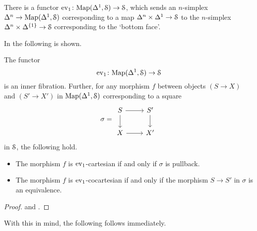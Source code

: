 \documentclass[main.tex]{subfiles}
\begin{document}
There is a functor $\ev_{1}\colon \Map(\Delta^{1}, \S) \to \S$, which sends an $n$-simplex $\Delta^{n} \to \Map(\Delta^{1}, \S)$ corresponding to a map $\Delta^{n} \times \Delta^{1} \to \S$ to the $n$-simplex $\Delta^{n} \times \Delta^{\{1\}} \to \S$ corresponding to the `bottom face'.

In \cite{highertopostheory} the following is shown.

\begin{proposition}
  The functor
  \begin{equation}
    \label{eq:ev1}
    \ev_{1}\colon \Map(\Delta^{1}, \S) \to \S
  \end{equation}
  is an inner fibration. Further, for any morphism $f$ between objects $(S \to X)$ and $(S' \to X')$ in $\Map(\Delta^{1}, \S)$ corresponding to a square
  \begin{equation*}
    \sigma =
    \begin{tikzcd}
      S
      \arrow[r]
      \arrow[d]
      & S'
      \arrow[d]
      \\
      X
      \arrow[r]
      & X'
    \end{tikzcd}
  \end{equation*}
  in $\S$, the following hold.
  \begin{itemize}
    \item The morphism $f$ is $\ev_{1}$-cartesian if and only if $\sigma$ is pullback.

    \item The morphism $f$ is $\ev_{1}$-cocartesian if and only if the morphism $S \to S'$ in $\sigma$ is an equivalence.
  \end{itemize}
\end{proposition}
\begin{proof}
  \cite[Lem.~6.1.1.1]{highertopostheory} and \cite[Lemma 2.4.7.12]{highertopostheory}.
\end{proof}

With this in mind, the following follows immediately.
\end{document}
